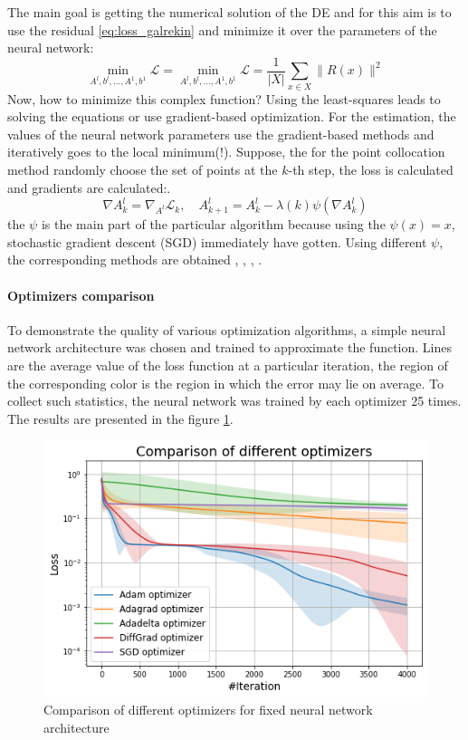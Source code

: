 The main goal is getting the numerical solution of the DE and for this aim is to use the residual \eqref{eq:loss_galrekin} and minimize it over the parameters of the neural network:
\begin{equation*}
	\min_{A^l, b^l, \dots, A^1, b^1} \mathcal{L} = \min_{A^l, b^l, \dots, A^1, b^1} \mathcal{L} = \dfrac{1}{| X |} \sum_{x \in X} \| R(x) \|^2
\end{equation*}
Now, how to minimize this complex function? Using the least-squares leads to solving the equations or use gradient-based optimization. For the estimation, the values of the neural network parameters use the gradient-based methods and iteratively goes to the local minimum(!). Suppose, the for the point collocation method randomly choose the set of points at the $k$-th step, the loss is calculated and gradients are calculated:.
\begin{equation}
	\nabla A_k^l = \nabla_{A^l} \mathcal{L}_k, \quad A_{k + 1}^l = A_k^l - \lambda(k) \psi(\nabla A_k^l)
\end{equation}
the $\psi$ is the main part of the particular algorithm because using the $\psi(x) = x$, stochastic gradient descent (SGD) immediately have gotten. Using different $\psi$, the corresponding methods are obtained \cite{Adadelta}, \cite{Adagrad}, \cite{Adam}, \cite{Diffgrad}.
\paragraph{Optimizers comparison}
To demonstrate the quality of various optimization algorithms, a simple neural network architecture was chosen and trained to approximate the function. Lines are the average value of the loss function at a particular iteration, the region of the corresponding color is the region in which the error may lie on average. To collect such statistics, the neural network was trained by each optimizer 25 times.
The results are presented in the figure \ref{fig:optimizers}.
\begin{figure}[h]
	\centering
	\includegraphics[width=0.75 \textwidth]{images/chapter2/optimizers.png}
	\caption{Comparison of different optimizers for fixed neural network architecture}
	\label{fig:optimizers}
\end{figure}


